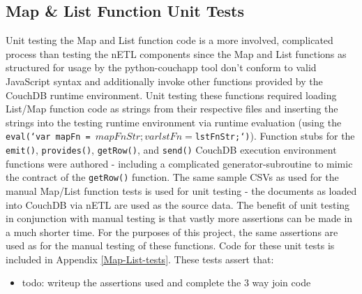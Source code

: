 \subsection{Map \& List Function Unit Tests}
Unit testing the Map and List function code is a more involved, complicated process than testing the nETL components since the Map and List functions as structured for usage by the python-couchapp tool don't conform to valid JavaScript syntax and additionally invoke other functions provided by the CouchDB runtime environment. Unit testing these functions required loading List/Map function code as strings from their respective files and inserting the strings into the testing runtime environment via runtime evaluation (using the \texttt{eval(`var mapFn = ${mapFnStr}; var lstFn = ${lstFnStr};`)}). Function stubs for the \texttt{emit()}, \texttt{provides()}, \texttt{getRow()}, and \texttt{send()} CouchDB execution environment functions were authored - including a complicated generator-subroutine to mimic the contract of the \texttt{getRow()} function. The same sample CSVs as used for the manual Map/List function tests is used for unit testing - the documents as loaded into CouchDB via nETL are used as the source data. The benefit of unit testing in conjunction with manual testing is that vastly more assertions can be made in a much shorter time. For the purposes of this project, the same assertions are used as for the manual testing of these functions. Code for these unit tests is included in Appendix \ref{Map-List-tests}. These tests assert that:

\begin{itemize}
  \item todo: writeup the assertions used and complete the 3 way join code
\end{itemize}